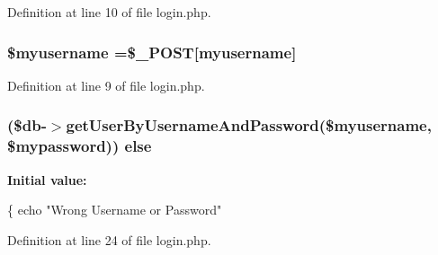 Definition at line 10 of file login.\+php.

\hypertarget{copy_2login_8php_a5dacfe932d81e07fdb90fc80dbf5a03f}{}
\subsubsection[{\$myusername}]{\setlength{\rightskip}{0pt plus 5cm}\$myusername =\$\+\_\+\+P\+O\+S\+T\mbox{[}\textquotesingle{}myusername\textquotesingle{}\mbox{]}}\label{copy_2login_8php_a5dacfe932d81e07fdb90fc80dbf5a03f}


Definition at line 9 of file login.\+php.

\hypertarget{copy_2login_8php_a6986c10ba08e74cdfb9f3ac3a66f9af9}{}
\subsubsection[{else}]{ (\$db-\/$>$get\+User\+By\+Username\+And\+Password(\$myusername, \$mypassword)) else}\label{copy_2login_8php_a6986c10ba08e74cdfb9f3ac3a66f9af9}
{\bfseries Initial value\+:}
\begin{DoxyCode}
\{
    echo \textcolor{stringliteral}{"Wrong Username or Password"}
\end{DoxyCode}


Definition at line 24 of file login.\+php.


